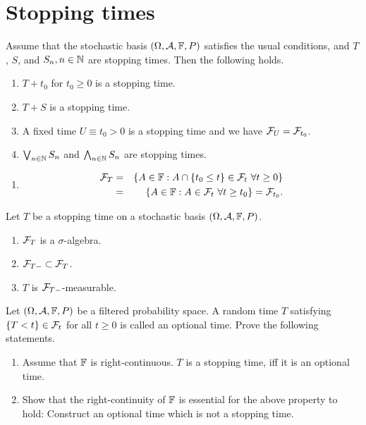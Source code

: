 \section{Stopping times}

 Assume that the stochastic basis
$(\Omega, \mathcal A, \mathbb F, P)$ satisfies the usual conditions, and $T$, $S$, and $S_n,
n\in\mathbb N$ are stopping times. Then the following holds.
\begin{enumerate}
    \item $T + t_0$ for $t_0\geq 0$ is a stopping time.
    \item $T+S$ is a stopping time.
    \item A fixed time $U \equiv t_0>0$ is a stopping time and we have $\mathcal F_U = \mathcal F_{t_0}$.
    \item $\bigvee_{n\in\mathbb N} S_n$ and $\bigwedge_{n\in\mathbb N} S_n$ are stopping times. 
\end{enumerate}

\solution
\begin{enumerate}
    \item \begin{align*}
            \mathcal F_T &=& 
            \left\{ A\in\mathbb F : A \cap \left\{ t_0 \leq t \right\}\in\mathcal F_t \ \forall t\geq 0 \right\} \\
            &=& \left\{ A\in\mathbb F : A\in\mathcal F_t \ \forall t\geq t_0 \right\} = \mathcal F_{t_0}.
        \end{align*}
\end{enumerate}

 Let $T$ be a stopping time on a
stochastic basis $(\Omega, \mathcal A, \mathbb F, P)$.
\begin{enumerate}
    \item $\mathcal F_T$ is a $\sigma$-algebra.
    \item $\mathcal F_{T-} \subset \mathcal F_{T}$.
    \item $T$ is $\mathcal F_{T-}$-measurable.
\end{enumerate}

 Let $(\Omega, \mathcal A,
\mathbb F, P)$ be a filtered probability space. A random time $T$ satisfying
$\{T<t\}\in\mathcal F_{t}$ for all $t\geq 0$ is called an optional time. Prove the
following statements.
\begin{enumerate}
    \item Assume that $\mathbb F$ is right-continuous. $T$ is a stopping time, iff it
        is an optional time.
    \item Show that the right-continuity of $\mathbb F$ is essential for the above
        property to hold: Construct an optional time which is not a stopping
        time.
\end{enumerate}

